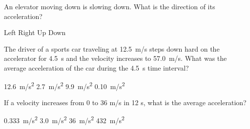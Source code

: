 \documentclass[]{exam}
\theoremstyle{definition}
\begin{document}
\begin{questions}
\question %
An elevator moving down is slowing down. What is the direction of its acceleration?

\begin{choices}
\choice Left
\choice Right 
\correctchoice Up
\choice Down
\end{choices}












\question %
The driver of a sports car traveling at \SI{12.5}{m/s} steps down hard on the accelerator for \SI{4.5}{s} and the velocity increases to \SI{57.0}{m/s}. What was the average acceleration of the car during the \SI{4.5}{s} time interval?

\begin{choices}
\choice \SI{12.6}{m/s^2}
\choice \SI{2.7}{m/s^2}
\CorrectChoice \SI{9.9}{m/s^2}
\choice \SI{0.10}{m/s^2}
\end{choices}

\question %
If a velocity increases from 0 to 36 m/s in 12 s, what is the average acceleration?

\begin{choices}
\choice \SI{0.333}{m/s^2}
\CorrectChoice \SI{3.0}{m/s^2}
\choice \SI{36}{m/s^2}
\choice \SI{432}{m/s^2}
\end{choices}


\end{questions}
\end{document}
